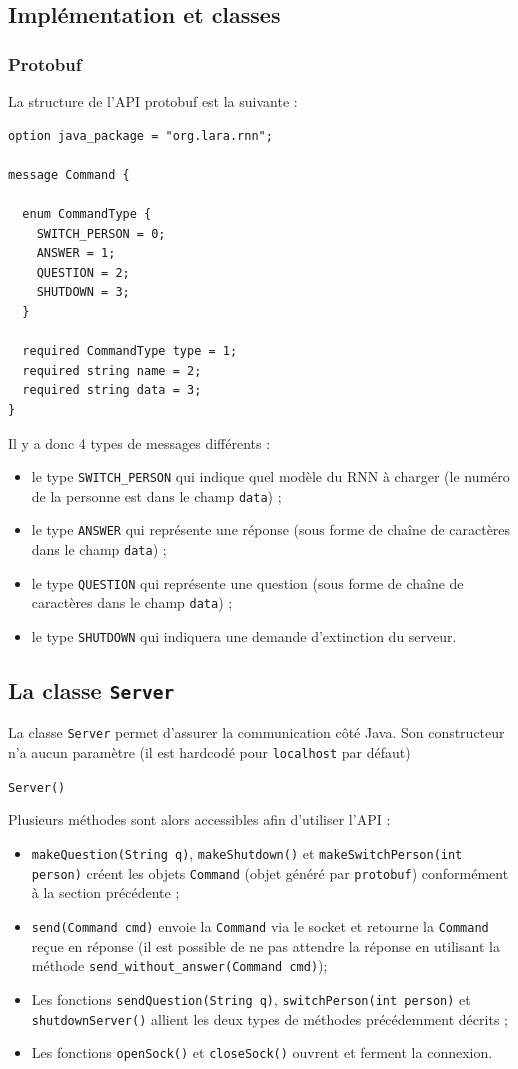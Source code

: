 \documentclass[10pt,a4paper]{article}
\begin{document}
\subsection{Implémentation et classes}
\subsubsection{Protobuf}
La structure de l'API protobuf est la suivante :
\begin{verbatim}
option java_package = "org.lara.rnn";

message Command {

  enum CommandType {
    SWITCH_PERSON = 0;
    ANSWER = 1;
    QUESTION = 2;
    SHUTDOWN = 3;
  }

  required CommandType type = 1;
  required string name = 2;
  required string data = 3;
}
\end{verbatim}
Il y a donc 4 types de messages différents :
\begin{itemize}
	\item le type \texttt{SWITCH\_PERSON} qui indique quel modèle du RNN à charger (le numéro de la personne est dans le champ \texttt{data}) ;
	\item le type \texttt{ANSWER} qui représente une réponse (sous forme de chaîne de caractères dans le champ \texttt{data}) ;
	\item le type \texttt{QUESTION} qui représente une question (sous forme de chaîne de caractères dans le champ \texttt{data}) ;
	\item le type \texttt{SHUTDOWN} qui indiquera une demande d'extinction du serveur.
\end{itemize}
\subsection{La classe \texttt{Server}}
La classe \texttt{Server} permet d'assurer la communication côté Java. Son constructeur n'a aucun paramètre (il est hardcodé pour \texttt{localhost} par défaut)
\begin{center}
	\texttt{Server()}
\end{center}
Plusieurs méthodes sont alors accessibles afin d'utiliser l'API :
\begin{itemize}
	\item \texttt{makeQuestion(String q)}, \texttt{makeShutdown()} et \texttt{makeSwitchPerson(int person)} créent les objets \texttt{Command} (objet généré par \texttt{protobuf}) conformément à la section précédente ;
	\item \texttt{send(Command cmd)} envoie la \texttt{Command} via le socket et retourne la \texttt{Command} reçue en réponse (il est possible de ne pas attendre la réponse en utilisant la méthode \texttt{send\_without\_answer(Command cmd)});
	\item Les fonctions \texttt{sendQuestion(String q)}, \texttt{switchPerson(int person)} et \texttt{shutdownServer()} allient les deux types de méthodes précédemment décrits ;
	\item Les fonctions \texttt{openSock()} et \texttt{closeSock()} ouvrent et ferment la connexion.
\end{itemize}
\end{document}
